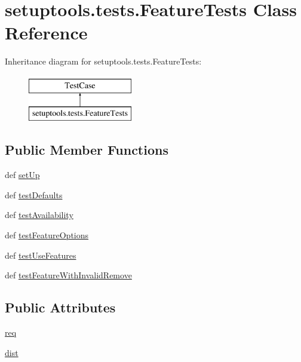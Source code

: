 \hypertarget{classsetuptools_1_1tests_1_1FeatureTests}{}\section{setuptools.\+tests.\+Feature\+Tests Class Reference}
\label{classsetuptools_1_1tests_1_1FeatureTests}
Inheritance diagram for setuptools.\+tests.\+Feature\+Tests\+:\begin{figure}[H]
\begin{center}
\leavevmode
\includegraphics[height=2.000000cm]{classsetuptools_1_1tests_1_1FeatureTests}
\end{center}
\end{figure}
\subsection*{Public Member Functions}
\begin{DoxyCompactItemize}
\item 
def \hyperlink{classsetuptools_1_1tests_1_1FeatureTests_ae697e14472024ef731f8173e839a6651}{set\+Up}
\item 
def \hyperlink{classsetuptools_1_1tests_1_1FeatureTests_ad007da2546724b2b731d508445577f3f}{test\+Defaults}
\item 
def \hyperlink{classsetuptools_1_1tests_1_1FeatureTests_aa0b4340cd77ee0ab74124de9b022ce3f}{test\+Availability}
\item 
def \hyperlink{classsetuptools_1_1tests_1_1FeatureTests_a9a73a8457ca813cce699855083e3d9e8}{test\+Feature\+Options}
\item 
def \hyperlink{classsetuptools_1_1tests_1_1FeatureTests_aa2a68a9229b3935435908864672a9197}{test\+Use\+Features}
\item 
def \hyperlink{classsetuptools_1_1tests_1_1FeatureTests_a1eda92a87a17e7ecdce0cc07d8613080}{test\+Feature\+With\+Invalid\+Remove}
\end{DoxyCompactItemize}
\subsection*{Public Attributes}
\begin{DoxyCompactItemize}
\item 
\hyperlink{classsetuptools_1_1tests_1_1FeatureTests_a21a421e46f1bf5ffd49765c7d47ca3ee}{req}
\item 
\hyperlink{classsetuptools_1_1tests_1_1FeatureTests_a20a7ddfeb08daf82a62aea8863255171}{dist}
\end{DoxyCompactItemize}


